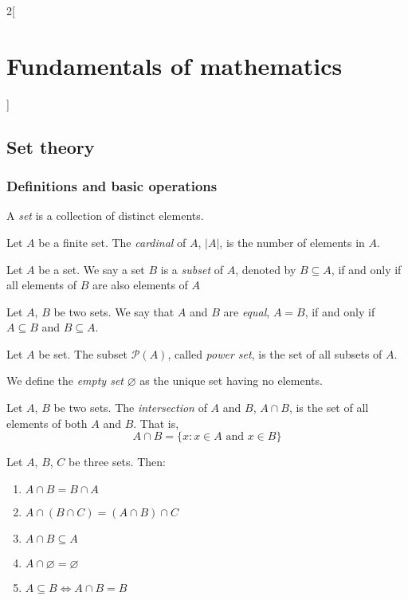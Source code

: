 \documentclass[../../../main.tex]{subfiles}
\begin{document}
\begin{multicols}{2}[\section{Fundamentals of mathematics}]
  \subsection{Set theory}
  \subsubsection{Definitions and basic operations}
  \begin{definition}
    A \emph{set} is a collection of distinct elements.
  \end{definition}
  \begin{definition}
    Let $A$ be a finite set. The \emph{cardinal} of $A$, $|A|$, is the number of elements in $A$.
  \end{definition}
  \begin{definition}
    Let $A$ be a set. We say a set $B$ is a \emph{subset} of $A$, denoted by $B\subseteq A$, if and only if all elements of $B$ are also elements of $A$
  \end{definition}
  \begin{axiom}
    Let $A$, $B$ be two sets. We say that $A$ and $B$ are \emph{equal}, $A=B$, if and only if $A\subseteq B$ and $B\subseteq A$.
  \end{axiom}
  \begin{definition}
    Let $A$ be set. The subset $\mathcal{P}(A)$, called \emph{power set}, is the set of all subsets of $A$.
  \end{definition}
  \begin{definition}
    We define the \emph{empty set} $\varnothing$ as the unique set having no elements.
  \end{definition}
  \begin{definition}
    Let $A$, $B$ be two sets. The \emph{intersection} of $A$ and $B$, $A\cap B$, is the set of all elements of both $A$ and $B$. That is, $$A\cap B=\{x:x\in A\text{ and }x\in B\}$$
  \end{definition}
  \begin{proposition}
    Let $A$, $B$, $C$ be three sets. Then:
    \begin{enumerate}
      \item $A\cap B=B\cap A$
      \item $A\cap(B\cap C)=(A\cap B)\cap C$
      \item $A\cap B\subseteq A$
      \item $A\cap\varnothing=\varnothing$
      \item $A\subseteq B\iff A\cap B=B$

\end{enumerate}
\end{proposition}
\end{multicols}
\end{document}
